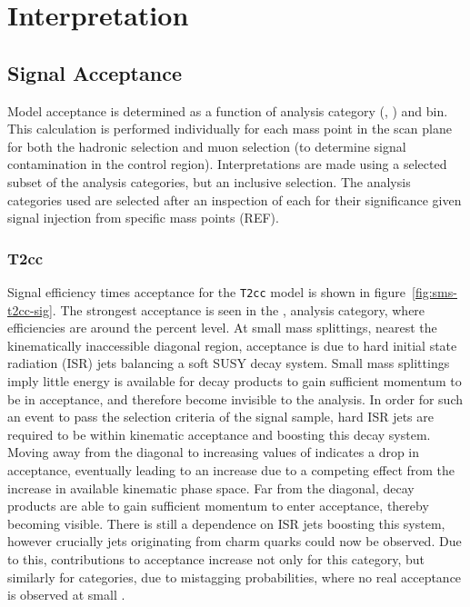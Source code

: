 \chapter{Interpretation}
\label{ch:9}

\ifpdf
    \graphicspath{{Chapter9/Figs/Raster/}{Chapter9/Figs/PDF/}{Chapter9/Figs/}}
\else
    \graphicspath{{Chapter9/Figs/Vector/}{Chapter9/Figs/}}
\fi

\section{Signal Acceptance}  %
\label{sec:interpretation_acceptance}

Model acceptance is determined as a function of analysis category (\nb, \nj) and
\HT bin. This calculation is performed individually for each mass point in the
scan plane for both the hadronic selection and muon selection (to determine 
signal contamination in the control region). Interpretations are made using a
selected subset of the analysis 
categories, but an inclusive \HT selection. The analysis categories used are 
selected after an inspection of each for their significance given signal 
injection from specific mass points (REF).

\subsection{T2cc}
Signal efficiency times acceptance for the \texttt{T2cc} model is shown in 
figure~\ref{fig:sms-t2cc-sig}. The strongest acceptance is seen in the \njlow, 
 analysis category, where efficiencies are around the percent level. At 
small mass splittings, nearest the kinematically inaccessible diagonal region, 
acceptance is due to hard initial state radiation (ISR) jets balancing a soft 
SUSY decay system. Small mass splittings imply little energy is available for 
decay products to gain sufficient momentum to be in acceptance, and therefore 
become invisible to the analysis. In order for such an event to pass the 
selection criteria of the signal sample, hard ISR jets are required to be within
kinematic acceptance and boosting this decay system. Moving away from the 
diagonal to increasing values of \deltam indicates a drop in acceptance, 
eventually leading to an increase due to a competing effect from the increase in
available kinematic phase space. Far from the diagonal, decay products are able 
to gain sufficient momentum to enter acceptance, thereby becoming visible. There
is still a dependence on ISR jets boosting this system, however crucially jets 
originating from charm quarks could now be observed. Due to this, contributions 
to acceptance increase not only for this  category, but similarly for 
categories, due to mistagging probabilities, where no real acceptance is 
observed at small \deltam.


